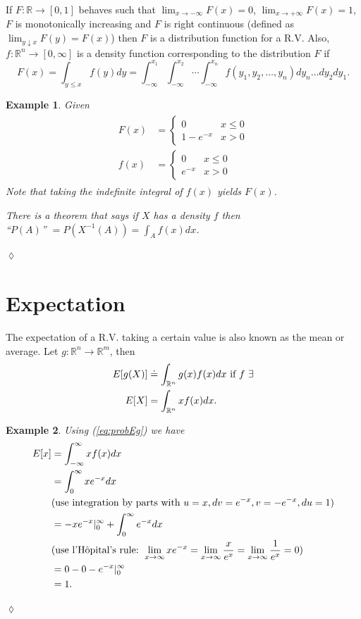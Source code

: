 \documentclass[lecture,12pt,]{pcms-l}
\theoremstyle{example}
\newtheorem{example}{Example}[section]
\begin{document}
If $F: \mathbb{R} \to [0,1]$ behaves such that $\lim_{x \to -\infty} F(x) = 0$, $\lim_{x \to +\infty} F(x) = 1$, $F$ is monotonically increasing and $F$ is right continuous (defined as $\lim_{y \downarrow x} F(y) = F(x)$) then $F$ is a distribution function for a R.V. Also, $f:\mathbb{R}^n \to [0,\infty]$ is a density function corresponding to the distribution $F$ if
$$F(x) = \int_{y \leq x} f(y)dy = \int_{-\infty}^{x_1} \int_{-\infty}^{x_2}\cdots \int_{-\infty}^{x_n} f(y_1,y_2,\ldots,y_n)dy_n\ldots dy_2dy_1.$$

\begin{example}
Given
\begin{align}
\label{eq:probEg}
\begin{split}
F(x) &= \begin{cases} 0 & x \leq 0 \\ 1-e^{-x} & x > 0 \end{cases} \\
f(x) &= \begin{cases} 0 & x \leq 0 \\ e^{-x} & x > 0 \end{cases}
\end{split}
\end{align}
Note that taking the indefinite integral of $f(x)$ yields $F(x)$.

There is a theorem that says if $X$ has a density $f$ then \\
``$P(A)$'' $= P\left(X^{-1}(A)\right) = \int_A f(x)dx$.
\end{example}
$\lozenge$

\section{Expectation}
The expectation of a R.V. taking a certain value is also known as the mean or average. Let $g: \mathbb{R}^n \to \mathbb{R}^m$, then
\begin{align*}
E[g(X)] &\doteq \int_{\mathbb{R}^n} g(x)f(x)dx \textnormal{ if } f ~ \exists \\
E[X] &= \int_{\mathbb{R}^n}xf(x)dx.
\end{align*}

\begin{example}
Using (\ref{eq:probEg}) we have
\begin{align*}
E[x] &= \int_{-\infty}^\infty xf(x)dx \\
&= \int_0^\infty xe^{-x}dx \\
&(\textnormal{use integration by parts with } u = x, dv = e^{-x}, v = -e^{-x}, du = 1) \\
&= -xe^{-x}\rvert_0^\infty + \int_0^\infty e^{-x}dx \\
&(\textnormal{use l'H\^opital's rule: } \lim_{x \to \infty} xe^{-x} = \lim_{x \to \infty} \frac{x}{e^x} = \lim_{x \to \infty} \frac{1}{e^x} = 0) \\
&= 0 - 0 - e^{-x}\rvert_0^\infty \\
&= 1.
\end{align*}
\end{example}
$\lozenge$
\end{document}
